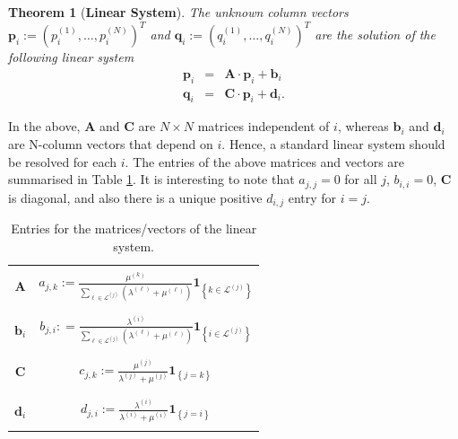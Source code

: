 \documentclass[10pt, conference, letterpaper]{IEEEtran}
\newtheorem{theo}{Theorem}
\begin{document}
{\begin{theo}[\textbf{Linear System}]
\label{th2}
The unknown column vectors $\mathbf{p}_i:=(p_i^{(1)},\ldots,p_i^{(N)})^T$ and $\mathbf{q}_i:=(q_i^{(1)},\ldots,q_i^{(N)})^T$ are the solution of the following linear system
\begin{eqnarray}
\label{LSa1}
\mathbf{p}_i & = & \mathbf{A}\cdot \mathbf{p}_i + \mathbf{b}_i\\
\label{LSb1}
\mathbf{q}_i & = & \mathbf{C}\cdot \mathbf{p}_i + \mathbf{d}_i.
\end{eqnarray}
\end{theo}


In the above, $\mathbf{A}$ and $\mathbf{C}$ are $N\times N$ matrices independent of $i$, whereas $\mathbf{b}_i$ and $\mathbf{d}_i$ are N-column vectors that depend on $i$. Hence, a standard linear system should be resolved for each $i$. The entries of the above matrices and vectors are summarised in Table \ref{T2}. It is interesting to note that $a_{j,j}=0$ for all $j$, $b_{i,i}=0$, $\mathbf{C}$ is diagonal, and also there is a unique positive $d_{i,j}$ entry for $i=j$. 

\begin{table}[ht!]
\centering
\begin{tabular}{|c|c|}
\hline
& \\
$\mathbf{A}$ & $a_{j,k}:=\frac{\mu^{(k)}}{\sum_{\ell\in\mathcal{L}^{(j)}}(\lambda^{(\ell)}+\mu^{(\ell)})}\mathbf{1}_{\left\{k\in\mathcal{L}^{(j)}\right\}}$\\
&  \\
\hline
&  \\
$\mathbf{b}_i$ & $b_{j,i} : = \frac{\lambda^{(i)}}{\sum_{\ell\in\mathcal{L}^{(j)}}(\lambda^{(\ell)}+\mu^{(\ell)})}\mathbf{1}_{\left\{i\in\mathcal{L}^{(j)}\right\}}$\\
&  \\
\hline
& \\
$\mathbf{C}$ & $c_{j,k}:=\frac{\mu^{(j)}}{\lambda^{(j)}+\mu^{(j)}}\mathbf{1}_{\left\{j=k\right\}}$\\
&  \\
\hline
 &  \\
$\mathbf{d}_i$ & $d_{j,i}:=\frac{\lambda^{(i)}}{\lambda^{(i)}+\mu^{(i)}}\mathbf{1}_{\left\{j=i\right\}}$\\
& \\
\hline
\end{tabular}
\caption{Entries for the matrices/vectors of the linear system.}
\label{T2}
\end{table}

}
\end{document}
